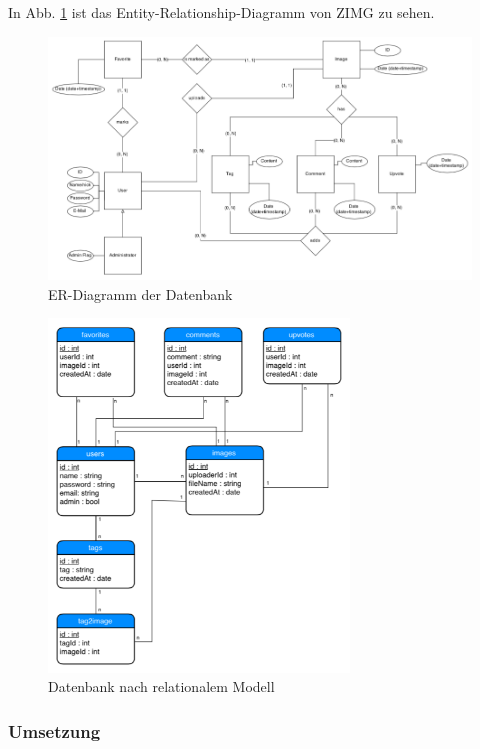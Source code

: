 \documentclass[12pt, oneside, a4paper]{article}		%
\begin{document}
In Abb. \ref{ERDiagramDatabase} ist das Entity-Relationship-Diagramm von ZIMG zu sehen.

\begin{figure}[H]
	\centering
	\includegraphics[width=\linewidth]{footage/ZIMG_ERDiagram_Database} 
	\caption{ER-Diagramm der Datenbank}
	\label{ERDiagramDatabase}
\end{figure}

\begin{figure}[H]
	\centering
	\includegraphics[width=8cm]{footage/ZIMG_RDiagram} 
	\caption{Datenbank nach relationalem Modell}
	\label{DBrelationalModel}
\end{figure}

\subsubsection{Umsetzung}
\end{document}
